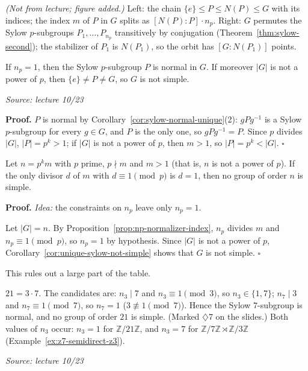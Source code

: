 \documentclass[11pt]{report}
\renewenvironment{proof}[1][Proof]{\noindent\textbf{#1.} }{\hfill$\square$\par\vspace{5pt}}
\newcommand{\srcline}[1]{\par\hfill{\footnotesize\textit{Source: #1}}}
\begin{document}
\textit{(Not from lecture; figure added.)} Left: the chain $\{e\} \leq P \leq N(P) \leq G$ with its indices; the index $m$ of $P$ in $G$ splits as $[N(P) : P] \cdot n_p$. Right: $G$ permutes the Sylow $p$-subgroups $P_1, \ldots, P_{n_p}$ transitively by conjugation (Theorem~\ref{thm:sylow-second}); the stabilizer of $P_1$ is $N(P_1)$, so the orbit has $[G : N(P_1)]$ points.

\begin{corbox}\label{cor:unique-sylow-not-simple}
If $n_p = 1$, then the Sylow $p$-subgroup $P$ is normal in $G$. If moreover $|G|$ is not a power of $p$, then $\{e\} \neq P \neq G$, so $G$ is not simple.
\srcline{lecture 10/23}
\end{corbox}

\begin{proof}
$P$ is normal by Corollary~\ref{cor:sylow-normal-unique}(2): $gPg^{-1}$ is a Sylow $p$-subgroup for every $g \in G$, and $P$ is the only one, so $gPg^{-1} = P$. Since $p$ divides $|G|$, $|P| = p^k > 1$; if $|G|$ is not a power of $p$, then $m > 1$, so $|P| = p^k < |G|$.
\end{proof}

\begin{corbox}\label{cor:sylow-test-simplicity}
Let $n = p^k m$ with $p$ prime, $p \nmid m$ and $m > 1$ (that is, $n$ is not a power of $p$). If the only divisor $d$ of $m$ with $d \equiv 1 \pmod p$ is $d = 1$, then no group of order $n$ is simple.
\end{corbox}

\begin{proof}
\textit{Idea:} the constraints on $n_p$ leave only $n_p = 1$.\par
Let $|G| = n$. By Proposition~\ref{prop:np-normalizer-index}, $n_p$ divides $m$ and $n_p \equiv 1 \pmod p$, so $n_p = 1$ by hypothesis. Since $|G|$ is not a power of $p$, Corollary~\ref{cor:unique-sylow-not-simple} shows that $G$ is not simple.
\end{proof}

This rules out a large part of the table.

\begin{exbox}[{Order $21$}]\label{ex:order-21}
$21 = 3 \cdot 7$. The candidates are: $n_3 \mid 7$ and $n_3 \equiv 1 \pmod 3$, so $n_3 \in \{1, 7\}$; $n_7 \mid 3$ and $n_7 \equiv 1 \pmod 7$, so $n_7 = 1$ ($3 \not\equiv 1 \pmod 7$). Hence the Sylow $7$-subgroup is normal, and no group of order $21$ is simple. (Marked $\diamondsuit 7$ on the slides.) Both values of $n_3$ occur: $n_3 = 1$ for $\mathbb{Z}/21\mathbb{Z}$, and $n_3 = 7$ for $\mathbb{Z}/7\mathbb{Z} \rtimes \mathbb{Z}/3\mathbb{Z}$ (Example~\ref{ex:z7-semidirect-z3}).
\srcline{lecture 10/23}
\end{exbox}
\end{document}
